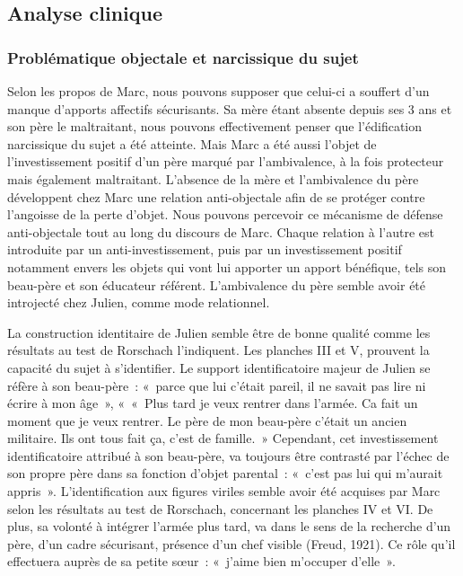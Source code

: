 \documentclass[12pt, a4paper]{book}
\begin{document}
\begin{spacing}{1.5}
\subsection{Analyse clinique}

\subsubsection{Problématique objectale et narcissique du sujet}

Selon les propos de Marc, nous pouvons supposer que celui-ci a souffert d'un manque d'apports affectifs sécurisants. Sa mère étant absente depuis ses 3 ans et son père le maltraitant, nous pouvons effectivement penser que l'édification narcissique du sujet a été atteinte. Mais Marc a été aussi l'objet de l'investissement positif d'un père marqué par l'ambivalence, à la fois protecteur mais également maltraitant. L'absence de la mère et l'ambivalence du père développent chez Marc une relation anti-objectale afin de se protéger contre l'angoisse de la perte d'objet. Nous pouvons percevoir ce mécanisme de défense anti-objectale tout au long du discours de Marc. Chaque relation à l'autre est introduite par un anti-investissement, puis par un investissement positif  notamment envers les objets qui vont lui apporter un apport bénéfique, tels son beau-père et son éducateur référent. L'ambivalence du père  semble avoir été introjecté chez Julien, comme mode relationnel. 

La construction identitaire de Julien semble être de bonne qualité comme les résultats au test de Rorschach l'indiquent. Les planches III et V, prouvent la capacité du sujet à s'identifier. Le support identificatoire majeur de Julien se réfère à son beau-père : « parce que lui c'était pareil, il ne savait pas lire ni écrire à mon âge », « « Plus tard je veux rentrer dans l'armée. Ca fait un moment que je veux rentrer. Le père de mon beau-père c'était un ancien militaire. Ils ont tous fait ça, c'est de famille. » Cependant, cet investissement identificatoire attribué à son beau-père, va toujours être contrasté par l'échec de son propre père dans sa fonction d'objet parental : « c'est pas lui qui m'aurait appris ». L'identification aux figures viriles semble avoir été acquises par Marc selon les résultats au test de Rorschach, concernant les planches IV et VI. De plus, sa volonté à intégrer l'armée plus tard, va dans le sens de la recherche d'un père, d'un cadre sécurisant, présence d'un chef visible (Freud, 1921). Ce rôle qu'il effectuera auprès de sa petite sœur : « j'aime bien m'occuper d'elle ».


\end{spacing}
\end{document}
